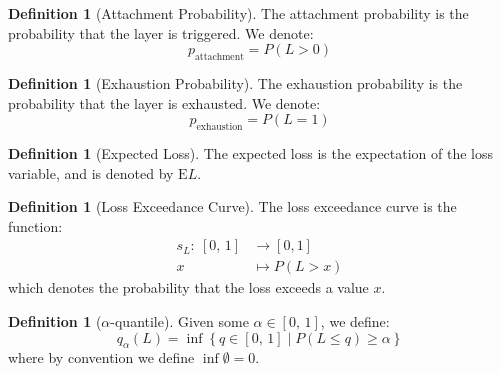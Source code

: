 \documentclass{amsart}
\theoremstyle{plain}
\theoremstyle{definition}
\newtheorem{definition}[subsubsection]{Definition}
\theoremstyle{definition}
\theoremstyle{remark}
\begin{document}
\begin{definition}[Attachment Probability]
    The attachment probability is the probability that the layer is triggered. We denote:
    \begin{equation*}
        p_{\text{attachment}} = P \left(L > 0\right)
    \end{equation*}
\end{definition}
\begin{definition}[Exhaustion Probability]
    The exhaustion probability is the probability that the layer is exhausted. We denote:
    \begin{equation*}
        p_{\text{exhaustion}} = P \left(L = 1\right)
    \end{equation*}
\end{definition}
\begin{definition}[Expected Loss]
    The expected loss is the expectation of the loss variable, and is denoted by \(\mathrm{E}L\).
\end{definition}
\begin{definition}[Loss Exceedance Curve]
   The loss exceedance curve is the function:
   \begin{align*}
       s_{L}: \ \left[0,\,1\right] &\rightarrow \left[0,1\right] \\
                                 x &\mapsto P \left(L > x\right)
   \end{align*}
   which denotes the probability that the loss exceeds a value \(x\).
\end{definition}
\begin{definition}[\(\alpha\)-quantile]
   Given some \(\alpha \in \left[0,\,1\right]\), we define:
   \begin{equation*}
       q_{\alpha} \left(L\right) = \inf \left\{q \in \left[0,\,1\right] \mid P \left(L \leq q\right) \geq \alpha\right\}
   \end{equation*}
   where by convention we define \(\inf \emptyset = 0\).
\end{definition}
\end{document}
